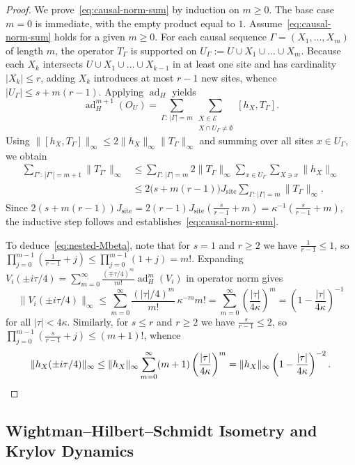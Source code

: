 \documentclass[11pt,a4paper]{article}
\numberwithin{equation}{section}
\theoremstyle{plain}
\theoremstyle{definition}
\newcommand{\ad}{\operatorname{ad}}
\begin{document}
\begin{proof}
We prove~\eqref{eq:causal-norm-sum} by induction on $m\ge 0$. The base case $m=0$ is immediate, with the empty product equal to $1$. Assume~\eqref{eq:causal-norm-sum} holds for a given $m\ge 0$. For each causal sequence $\Gamma = (X_1,\dots,X_m)$ of length $m$, the operator $T_\Gamma$ is supported on $U_\Gamma := U\cup X_1\cup\dots\cup X_m$. Because each $X_k$ intersects $U\cup X_1\cup\dots\cup X_{k-1}$ in at least one site and has cardinality $|X_k|\le r$, adding $X_k$ introduces at most $r-1$ new sites, whence $|U_\Gamma| \le s + m(r-1)$. Applying $\ad_H$ yields
\[
  \ad_H^{m+1}(O_U) = \sum_{\Gamma:\,|\Gamma|=m} \sum_{\substack{X\in\mathcal{E} \\ X\cap U_\Gamma\ne\emptyset}} [h_X, T_\Gamma].
\]
Using $\|[h_X,T_\Gamma]\|_\infty \le 2\|h_X\|_\infty\|T_\Gamma\|_\infty$ and summing over all sites $x\in U_\Gamma$, we obtain
\begin{align*}
  \sum_{\Gamma':\,|\Gamma'|=m+1} \|T_{\Gamma'}\|_\infty
  &\le \sum_{\Gamma:\,|\Gamma|=m} 2\|T_\Gamma\|_\infty \sum_{x\in U_\Gamma} \sum_{X\ni x}\|h_X\|_\infty \\
  &\le 2\bigl(s + m(r-1)\bigr)J_{\mathrm{site}} \sum_{\Gamma:\,|\Gamma|=m}\|T_\Gamma\|_\infty.
\end{align*}
Since $2(s + m(r-1))J_{\mathrm{site}} = 2(r-1)J_{\mathrm{site}}(\frac{s}{r-1}+m) = \kappa^{-1}(\frac{s}{r-1}+m)$, the inductive step follows and establishes~\eqref{eq:causal-norm-sum}.

To deduce~\eqref{eq:nested-Mbeta}, note that for $s=1$ and $r\ge 2$ we have $\frac{1}{r-1}\le 1$, so $\prod_{j=0}^{m-1}(\frac{1}{r-1}+j) \le \prod_{j=0}^{m-1}(1+j) = m!$. Expanding $V_i(\pm i\tau/4) = \sum_{m=0}^\infty \frac{(\mp\tau/4)^m}{m!}\ad_H^m(V_i)$ in operator norm gives
\[
  \|V_i(\pm i\tau/4)\|_\infty \le \sum_{m=0}^\infty \frac{(|\tau|/4)^m}{m!}\,\kappa^{-m} m! = \sum_{m=0}^\infty \left(\frac{|\tau|}{4\kappa}\right)^m = \left(1-\frac{|\tau|}{4\kappa}\right)^{-1}
\]
for all $|\tau|<4\kappa$. Similarly, for $s\le r$ and $r\ge 2$ we have $\frac{s}{r-1}\le 2$, so $\prod_{j=0}^{m-1}(\frac{s}{r-1}+j) \le (m+1)!$, whence
\[
  \|h_X(\pm i\tau/4)\|_\infty \le \|h_X\|_\infty \sum_{m=0}^\infty (m+1)\left(\frac{|\tau|}{4\kappa}\right)^m = \|h_X\|_\infty\left(1-\frac{|\tau|}{4\kappa}\right)^{-2}. \qedhere
\]
\end{proof}

\subsection{Wightman--Hilbert--Schmidt Isometry and Krylov Dynamics}\label{subsec:isometry}
\end{document}
